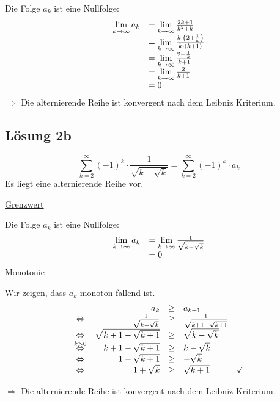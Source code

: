 \documentclass[main.tex]{subfiles}
\begin{document}
Die Folge $a_{k}$ ist eine Nullfolge:
\begin{equation*}
\begin{array}{ c l }
\lim\limits _{k\rightarrow \infty } a_{k} & =\lim\limits _{k\rightarrow \infty }\frac{2k+1}{k^{2} +k}\\
    & =\lim\limits _{k\rightarrow \infty }\frac{k\cdotp \left( 2+\frac{1}{k}\right)}{k \cdotp ( k+1)}\\
    & =\lim\limits _{k\rightarrow \infty }\frac{2+\frac{1}{k}}{k+1}\\
    & =\lim\limits _{k\rightarrow \infty }\frac{2}{k+1}\\
    & =0
\end{array}
\end{equation*}
$\Rightarrow$ Die alternierende Reihe ist konvergent nach dem Leibniz Kriterium.

\subsection{Lösung 2b}
\begin{equation*}
\sum\limits _{k=2}^{\infty }( -1)^{k} \cdotp \frac{1}{\sqrt{k-\sqrt{k}}} =\sum\limits _{k=2}^{\infty }( -1)^{k} \cdotp a_{k}
\end{equation*}
Es liegt eine alternierende Reihe vor.

\underline{Grenzwert}

Die Folge $a_{k}$ ist eine Nullfolge:
\begin{equation*}
\begin{array}{ c l }
\lim\limits _{k\rightarrow \infty } a_{k} & =\lim\limits _{k\rightarrow \infty }\frac{1}{\sqrt{k-\sqrt{k}}}\\
    & =0
\end{array}
\end{equation*}
\underline{Monotonie}

Wir zeigen, dass $a_{k}$ monoton fallend ist.
\begin{equation*}
\begin{array}{ c r c l c }
    & a_{k} & \geq  & a_{k+1} & \\
\Leftrightarrow  & \frac{1}{\sqrt{k-\sqrt{k}}} & \geq  & \frac{1}{\sqrt{k+1-\sqrt{k+1}}} & \\
\Leftrightarrow  & \sqrt{k+1-\sqrt{k+1}} & \geq  & \sqrt{k-\sqrt{k}} & \\
\overset{k >0}{\Leftrightarrow } & k+1-\sqrt{k+1} & \geq  & k-\sqrt{k} & \\
\Leftrightarrow  & 1-\sqrt{k+1} & \geq  & -\sqrt{k} & \\
\Leftrightarrow  & 1+\sqrt{k} & \geq  & \sqrt{k+1} & \checked
\end{array}
\end{equation*}


$\Rightarrow$ Die alternierende Reihe ist konvergent nach dem Leibniz Kriterium.
\end{document}
